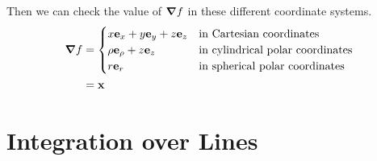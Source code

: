 \documentclass{article}
\begin{document}
Then we can check the value of $\grad f$ in these different coordinate systems.
\begin{align*}
	\grad f & = \begin{cases}
		x \vb e_x + y \vb e_y + z \vb e_z & \text{in Cartesian coordinates}         \\
		\rho \vb e_\rho + z \vb e_z       & \text{in cylindrical polar coordinates} \\
		r \vb e_r                         & \text{in spherical polar coordinates}   \\
	\end{cases} \\
	        & = \vb x
\end{align*}

\section{Integration over Lines}
\end{document}
